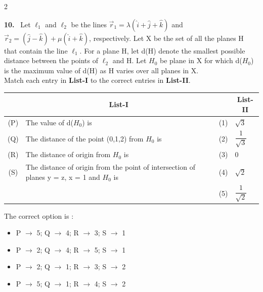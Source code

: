 \documentclass[10pt]{extarticle}
\newcommand{\qn}[1]{\par\smallskip\noindent\textbf{#1.}~}
\newenvironment{qoptions}{\begin{itemize}[leftmargin=1.8em,itemsep=1pt,topsep=2pt,label={}]}{\end{itemize}}
\newcommand{\opt}[2]{\item[(#1)] #2}
\begin{document}
\begin{multicols}{2}
\qn{10} Let $\ell_1$ and $\ell_2$ be the lines $\vec r_1=\lambda\left(\hat i+\hat j+\hat k\right)$ and $\vec r_2=\left(\hat j-\hat k\right)+\mu\left(\hat i+\hat k\right)$, respectively. Let X be the set of all the planes H that contain the line $\ell_1$. For a plane H, let d(H) denote the smallest possible distance between the points of $\ell_2$ and H. Let $H_0$ be plane in X for which d($H_0$) is the maximum value of d(H) as H varies over all planes in X.\\
Match each entry in \textbf{List-I} to the correct entries in \textbf{List-II}.\par\nobreak
\begin{center}\small\setlength{\tabcolsep}{3pt}
\begin{tabular}{|c|p{3.9cm}|c|p{1.0cm}|}
\hline
 & \multicolumn{1}{c|}{\textbf{List-I}} & & \multicolumn{1}{c|}{\textbf{\footnotesize List-II}} \\
\hline
(P) & The value of d($H_0$) is & (1) & $\sqrt3$ \\
\hline
(Q) & The distance of the point (0,1,2) from $H_0$ is & (2) & $\dfrac1{\sqrt3}$ \\
\hline
(R) & The distance of origin from $H_0$ is & (3) & 0 \\
\hline
(S) & The distance of origin from the point of intersection of planes y = z, x = 1 and $H_0$ is & (4) & $\sqrt2$ \\
\hline
 & & (5) & $\dfrac1{\sqrt2}$ \\
\hline
\end{tabular}
\end{center}
The correct option is :
\begin{qoptions}
\opt{A}{P $\to$ 5; Q $\to$ 4; R $\to$ 3; S $\to$ 1}
\opt{B}{P $\to$ 2; Q $\to$ 4; R $\to$ 5; S $\to$ 1}
\opt{C}{P $\to$ 2; Q $\to$ 1; R $\to$ 3; S $\to$ 2}
\opt{D}{P $\to$ 5; Q $\to$ 1; R $\to$ 4; S $\to$ 2}
\end{qoptions}


\end{multicols}
\end{document}
